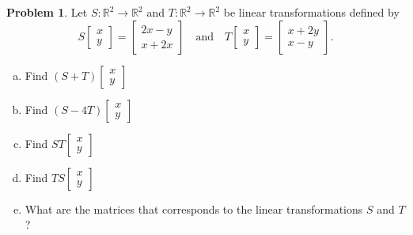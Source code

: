 \documentclass[10pt]{article}
\theoremstyle{definition}
\newtheorem{problem}[theorem]{Problem}
\newcommand{\1}[1]{\textbf{1}_{\left[#1\right]}} %
\def\R{\mathbb{R}} %
\begin{document}
\begin{problem}
  Let $S:\R^{2}\to \R^{2}$ and $T: \R^{2}\to \R^{2}$ be linear transformations
  defined by
  \begin{equation*}
    S
    \begin{bmatrix}
      x\\y
    \end{bmatrix}
    =
    \begin{bmatrix}
      2x-y\\
      x+2x
    \end{bmatrix}
    \quad \text{and} \quad
    T
    \begin{bmatrix}
      x\\y
    \end{bmatrix}
    =
    \begin{bmatrix}
      x+2y\\x-y
    \end{bmatrix}.
  \end{equation*}
  \begin{enumerate}[(a)]
    \item Find $(S+T)
    \begin{bmatrix}
      x\\y
    \end{bmatrix}
    $
    \item Find $(S-4T)
    \begin{bmatrix}
      x\\y
    \end{bmatrix}
    $
    \item Find $ST
    \begin{bmatrix}
      x\\y
    \end{bmatrix}
    $
    \item Find $TS
    \begin{bmatrix}
      x\\y
    \end{bmatrix}
    $
    \item What are the matrices that corresponds to the linear transformations
    $S$ and $T$?
    
  \end{enumerate}
\end{problem}
\end{document}
